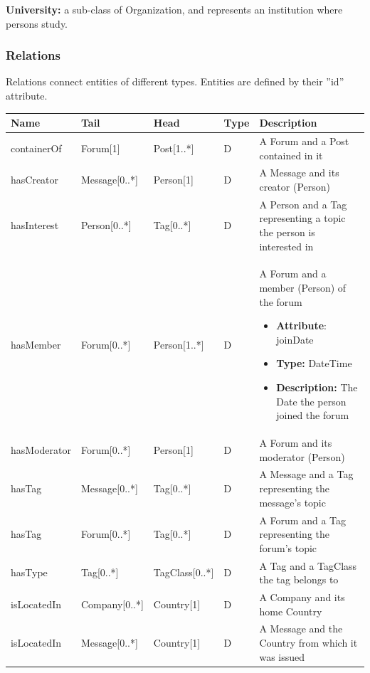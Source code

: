 {\flushleft \textbf{University:}} a sub-class of Organization,
and represents an institution where persons study.

\subsubsection{Relations}

Relations connect entities of different types. Entities are defined by their ''id'' attribute.

\begin{longtable}{|p{2cm}|p{2.5cm}|p{2.5cm}|p{1cm}|p{7cm}|}
       \hline
        \textbf{Name} & \textbf{Tail} & \textbf{Head} & \textbf{Type} & \textbf{Description} \\
        \hline
        containerOf & Forum[1] & Post[1..*] & D & A Forum and a Post contained in it\\
        \hline
        hasCreator & Message[0..*] & Person[1] & D & A Message and its creator (Person)\\
        \hline
        hasInterest & Person[0..*] & Tag[0..*] & D & A Person and a Tag representing a topic the person is interested in\\
        \hline
        hasMember & Forum[0..*] &  Person[1..*] & D & A  Forum and a member (Person) of the forum
        \begin{itemize}
            \item \textbf{Attribute}: joinDate
            \item \textbf{Type:} DateTime
            \item \textbf{Description:} The Date the person joined the forum
        \end{itemize}
        \\
        \hline
        hasModerator & Forum[0..*] & Person[1] & D & A Forum and its moderator (Person) \\
        \hline
        hasTag & Message[0..*] & Tag[0..*] & D & A Message and a Tag representing the message's topic \\
        \hline
        hasTag & Forum[0..*] & Tag[0..*] & D & A Forum and a Tag representing the forum's topic \\
        \hline
        hasType & Tag[0..*] & TagClass[0..*] & D & A Tag and a TagClass the tag belongs to \\
        \hline
        isLocatedIn & Company[0..*] & Country[1] & D & A Company and its home Country \\
        \hline
        isLocatedIn & Message[0..*] & Country[1] & D & A Message and the Country from which it was issued \\

\end{longtable}
